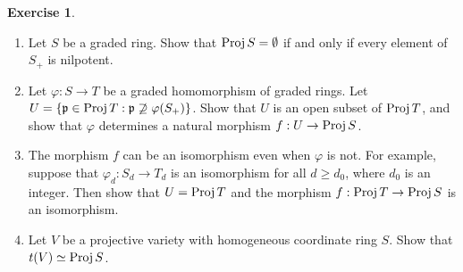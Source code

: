 \documentclass[]{pcmi}
\theoremstyle{plain}
\theoremstyle{definition}
\newtheorem{Exercise}[subsubsection]{Exercise}
\theoremstyle{remark}
\begin{document}
\begin{Exercise}\label{exercise:II.2.14}
    \phantom{h}
    \begin{enumerate}[label = (\alph*)]
        \item Let $S$ be a graded ring. Show that $\operatorname{Proj} S = \emptyset$ if and only if every element of $S_+$ is nilpotent. 
        \item Let $\varphi : S \to T$ be a graded homomorphism of graded rings. Let $U = \{\mathfrak{p} \in \operatorname{Proj} T : \mathfrak{p} \not \supseteq \varphi(S_+)\}$. Show that $U$ is an open subset of $\operatorname{Proj} T$, and show that $\varphi$ determines a natural morphism $f : U \to \operatorname{Proj} S$.
        \item The morphism $f$ can be an isomorphism even when $\varphi$ is not. For example, suppose that $\varphi_d : S_d \to T_d$ is an isomorphism for all $d \geq d_0$, where $d_0$ is an integer. Then show that $U = \operatorname{Proj} T$ and the morphism $f : \operatorname{Proj} T \to \operatorname{Proj} S$ is an isomorphism. 
        \item Let $V$ be a projective variety with homogeneous coordinate ring $S$. Show that $t(V) \simeq \operatorname{Proj} S$. 
    \end{enumerate}
\end{Exercise}
\end{document}
